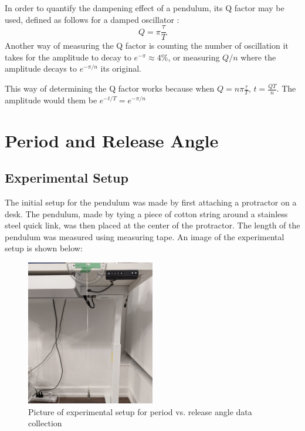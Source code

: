 \documentclass[12pt]{article}
\begin{document}
In order to quantify the dampening effect of a pendulum, its Q factor may be used, defined as follows for a damped oscillator \cite{pnp-physics}:
\begin{equation} \label{eq:eq4}
    Q = \pi\frac{\tau}{T}
\end{equation}
Another way of measuring the Q factor is counting the number of oscillation it takes for the amplitude to decay to $e^{-\pi} \approx 4\%$, or measuring $Q/n$ where the amplitude decays to $e^{-{\pi/n}}$ its original.

This way of determining the Q factor works because when $Q = n\pi\frac{\tau}{T}$, $t = \frac{QT}{n}$. The amplitude would them be $e^{-{t/T}} = e^{-{\pi/n}}$

\section{Period and Release Angle}

\subsection{Experimental Setup}
The initial setup for the pendulum was made by first attaching a protractor on a desk. The pendulum, made by tying a piece of cotton string around a stainless steel quick link, was then placed at the center of the protractor. The length of the pendulum was measured using measuring tape. An image of the experimental setup is shown below:

\begin{figure}[!hptb]
    \centering
    \includegraphics[width=0.5\textwidth]{../figures/exp_setup1.jpg}
    \caption{\centering Picture of experimental setup for period vs. release angle data collection}
    \label{fig:figure 1}
\end{figure}
\end{document}
